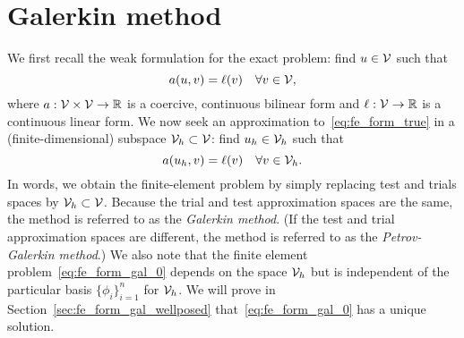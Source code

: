 \section{Galerkin method}
We first recall the weak formulation for the exact problem: find $u \in \mathcal{V}$ such that
\begin{equation}
  a(u,v) = \ell(v) \quad \forall v \in \mathcal{V},
  \label{eq:fe_form_true}
\end{equation}
where $a: \mathcal{V} \times \mathcal{V} \to \mathbb{R}$ is a coercive, continuous bilinear form and $\ell: \mathcal{V} \to \mathbb{R}$ is a continuous linear form. We now seek an approximation to~\eqref{eq:fe_form_true} in a (finite-dimensional) subspace $\mathcal{V}_h \subset \mathcal{V}$: find $u_h \in \mathcal{V}_h$ such that
\begin{equation}
  a(u_h,v) = \ell(v) \quad \forall v \in \mathcal{V}_h.
  \label{eq:fe_form_gal_0}
\end{equation}
In words, we obtain the finite-element problem by simply replacing test and trials spaces by $\mathcal{V}_h \subset \mathcal{V}$.  Because the trial and test approximation spaces are the same, the method is referred to as the \emph{Galerkin method}.  (If the test and trial approximation spaces are different, the method is referred to as the \emph{Petrov-Galerkin method}.) We also note that the finite element problem~\eqref{eq:fe_form_gal_0} depends on the space $\mathcal{V}_h$ but is independent of the particular basis $\{ \phi_i \}_{i=1}^n$ for $\mathcal{V}_h$.  We will prove in Section~\ref{sec:fe_form_gal_wellposed} that~\eqref{eq:fe_form_gal_0} has a unique solution.

